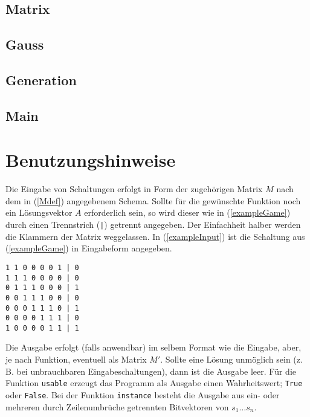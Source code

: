 \documentclass{scrartcl}
\newcommand{\listSec}[1]{%
  \subsection*{#1}
  
}
\begin{document}
\listSec{Matrix}
\listSec{Gauss}
\listSec{Generation}
\listSec{Main}

\section{Benutzungshinweise}
Die Eingabe von Schaltungen erfolgt in Form der zugehörigen Matrix $M$ nach dem
in (\ref{Mdef}) angegebenem Schema. Sollte für die gewünschte Funktion noch ein
Lösungsvektor $A$ erforderlich sein, so wird dieser wie in (\ref{exampleGame})
durch einen Trennstrich (\texttt{|}) getrennt angegeben. Der Einfachheit halber
werden die Klammern der Matrix weggelassen. In (\ref{exampleInput}) ist die
Schaltung aus (\ref{exampleGame}) in Eingabeform angegeben.\label{exampleInput}
\begin{Verbatim}
1 1 0 0 0 0 1 | 0
1 1 1 0 0 0 0 | 0
0 1 1 1 0 0 0 | 1
0 0 1 1 1 0 0 | 0
0 0 0 1 1 1 0 | 1
0 0 0 0 1 1 1 | 0
1 0 0 0 0 1 1 | 1
\end{Verbatim}

Die Ausgabe erfolgt (falls anwendbar) im selbem Format wie die Eingabe, aber, je
nach Funktion, eventuell als Matrix $M'$. Sollte eine Lösung unmöglich sein
(z.\,B. bei unbrauchbaren Eingabeschaltungen), dann ist die Ausgabe leer. Für
die Funktion \texttt{usable} erzeugt das Programm als Ausgabe einen
Wahrheitswert; \texttt{True} oder \texttt{False}. Bei der Funktion \texttt
{instance} besteht die Ausgabe aus ein- oder mehreren durch Zeilenumbrüche
getrennten Bitvektoren von $s_1\dots s_n$.
\end{document}
